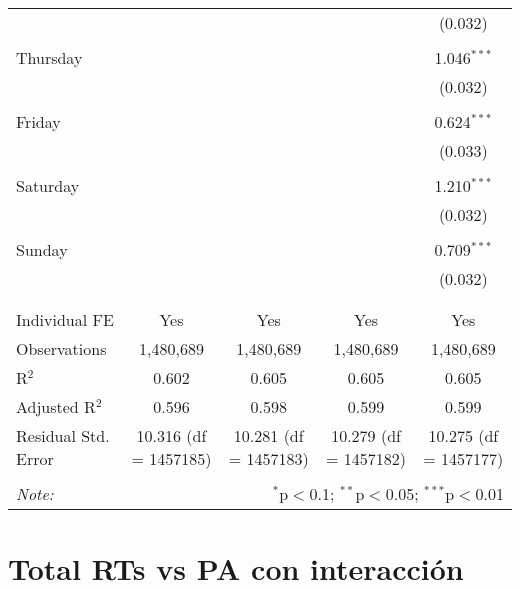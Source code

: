 \documentclass[
]{article}
\begin{document}
\begin{table}[!htbp]
{\begin{tabular}{@{\extracolsep{5pt}}lcccc}
  &  &  &  & (0.032) \\ 
  & & & & \\ 
 Thursday &  &  &  & 1.046$^{***}$ \\ 
  &  &  &  & (0.032) \\ 
  & & & & \\ 
 Friday &  &  &  & 0.624$^{***}$ \\ 
  &  &  &  & (0.033) \\ 
  & & & & \\ 
 Saturday &  &  &  & 1.210$^{***}$ \\ 
  &  &  &  & (0.032) \\ 
  & & & & \\ 
 Sunday &  &  &  & 0.709$^{***}$ \\ 
  &  &  &  & (0.032) \\ 
  & & & & \\ 
\hline \\[-1.8ex] 
Individual FE & Yes & Yes & Yes & Yes \\ 
Observations & 1,480,689 & 1,480,689 & 1,480,689 & 1,480,689 \\ 
R$^{2}$ & 0.602 & 0.605 & 0.605 & 0.605 \\ 
Adjusted R$^{2}$ & 0.596 & 0.598 & 0.599 & 0.599 \\ 
Residual Std. Error & 10.316 (df = 1457185) & 10.281 (df = 1457183) & 10.279 (df = 1457182) & 10.275 (df = 1457177) \\ 
\hline 
\hline \\[-1.8ex] 
\textit{Note:}  & \multicolumn{4}{r}{$^{*}$p$<$0.1; $^{**}$p$<$0.05; $^{***}$p$<$0.01} \\ 
\end{tabular}
} 
\end{table} 
\newpage
\section{Total RTs vs PA con interacción}
\end{document}
